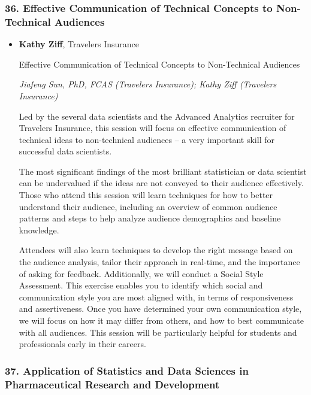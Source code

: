 \begin{itemize}
\end{itemize}

\subsubsection*{36. Effective Communication of Technical Concepts to Non-Technical Audiences}

\begin{itemize}
\item \textbf{Kathy Ziff}, Travelers Insurance

Effective Communication of Technical Concepts to Non-Technical Audiences

\emph{\footnotesize Jiafeng Sun, PhD, FCAS (Travelers Insurance); Kathy Ziff (Travelers Insurance)}

Led by the several data scientists and the Advanced Analytics recruiter for Travelers Insurance, this session will focus on effective communication of technical ideas to non-technical audiences – a very important skill for successful data scientists.  

The most significant findings of the most brilliant statistician or data scientist can be undervalued if the ideas are not conveyed to their audience effectively. Those who attend this session will learn techniques for how to better understand their audience, including an overview of common audience patterns and steps to help analyze audience demographics and baseline knowledge.  

Attendees will also learn techniques to develop the right message based on the audience analysis, tailor their approach in real-time, and the importance of asking for feedback. Additionally, we will conduct a Social Style Assessment.  This exercise enables you to identify which social and communication style you are most aligned with, in terms of responsiveness and assertiveness.  Once you have determined your own communication style, we will focus on how it may differ from others, and how to best communicate with all audiences. This session will be particularly helpful for students and professionals early in their careers. 

\end{itemize}

\subsubsection*{37. Application of Statistics and Data Sciences in Pharmaceutical Research and Development}

